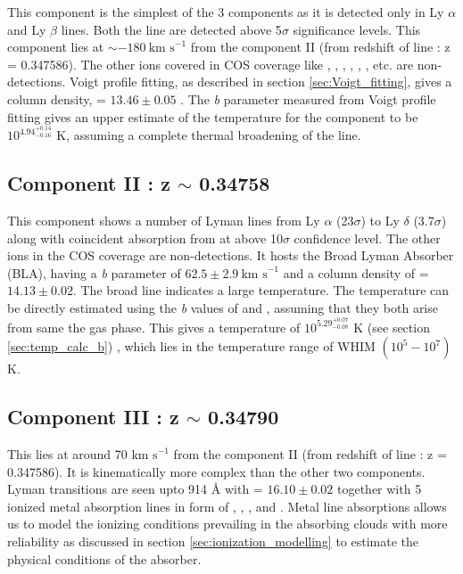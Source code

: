 This component is the simplest of the 3 components as it is detected only in Ly $\alpha$ and Ly $\beta$ lines. Both the line are detected above 5$\sigma$ significance levels. This component lies at $\sim -180 \ \text{km s}^{-1}$ from the component II (from redshift of  line : z = 0.347586). The other ions covered in COS coverage like , , , , , , etc. are non-detections. Voigt profile fitting, as described in section \ref{sec:Voigt_fitting}, gives a  column density,  = $13.46 \pm 0.05$ . The \emph{b} parameter measured from Voigt profile fitting gives an upper estimate of the temperature for the component to be $10^{{4.94}_{-0.16}^{+0.14}}$ K, assuming a complete thermal broadening of the line. 

\subsection{Component II : z $\sim$ 0.34758}

This component shows a number of Lyman lines from Ly $\alpha$ (23$\sigma$) to Ly $\delta$ (3.7$\sigma$) along with coincident absorption from  at above 10$\sigma$ confidence level. The other ions in the COS coverage are non-detections. It hosts the Broad Lyman Absorber (BLA), having a \emph{b} parameter of $62.5 \pm 2.9 \ \text{km s}^{-1}$ and a column density of  = $14.13 \pm 0.02$. The broad line indicates a large temperature. The temperature can be directly estimated using the \emph{b} values of  and , assuming that they both arise from same the gas phase. This gives a temperature of ${10}^{{5.29}_{-0.08}^{+0.07}}$ K (see section \ref{sec:temp_calc_b}) , which lies in the temperature range of WHIM $(10^5-10^7)$ K.   

\subsection{Component III : z $\sim$ 0.34790}

This lies at around 70 $\text{km s}^{-1}$ from the component II (from redshift of  line : z = 0.347586). It is kinematically more complex than the other two components. Lyman transitions are seen upto  914 {\AA} with  = $16.10 \pm 0.02$ together with 5 ionized metal absorption lines in form of , , ,  and . Metal line absorptions allows us to model the ionizing conditions prevailing in the absorbing clouds with more reliability as discussed in section \ref{sec:ionization_modelling} to estimate the physical conditions of the absorber. 

